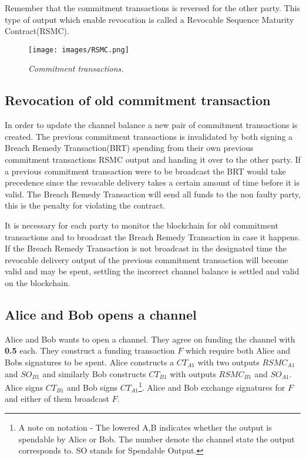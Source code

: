Remember that the commitment transactions is reversed for the other party. This type of output which enable revocation is called a Revocable Sequence Maturity Contract(RSMC).

\begin{figure}[!htb]
			\hspace*{-0.8cm} 
	\centering
	\texttt{[image: images/RSMC.png]}
	\caption{\textit{Commitment transactions. 
	}}
	\label{fig:merkle:tree}
			\hspace*{2mm} 
\end{figure}

\subsection{Revocation of old commitment transaction}

In order to update the channel balance a new pair of commitment transactions is created. The previous commitment transactions is invalidated by both signing a Breach Remedy Transaction(BRT) spending from their own previous commitment transactions RSMC output and handing it over to the other party. If a previous commitment transaction were to be broadcast the BRT would take precedence since the revocable delivery takes a certain amount of time before it is valid. The Breach Remedy Transaction will send all funds to the non faulty party, this is the penalty for violating the contract.

It is necessary for each party to monitor the blockchain for old commitment transactions and to broadcast the Breach Remedy Transaction in case it happens. If the Breach Remedy Transaction is not broadcast in the designated time the revocable delivery output of the previous commitment transaction will become valid and may be spent, settling the incorrect channel balance is settled and valid on the blockchain.

\subsection{Alice and Bob opens a channel}

Alice and Bob wants to open a channel. They agree on funding the channel with \textbf{0.5\bitcoin} each. They construct a funding transaction $F$ which require both Alice and Bobs signatures to be spent. Alice constructs a $CT_{A1}$ with two outputs $RSMC_{A1}$ and $SO_{B1}$ and similarly Bob constructs $CT_{B1}$ with outputs $RSMC_{B1}$ and $SO_{A1}$. Alice signs $CT_{B1}$ and Bob signs $CT_{A1}$\footnote{A note on notation - The lowered A,B indicates whether the output is spendable by Alice or Bob. The number denote the channel state the output corresponds to. SO stands for Spendable Output.}. Alice and Bob exchange signatures for $F$ and either of them broadcast $F$.

